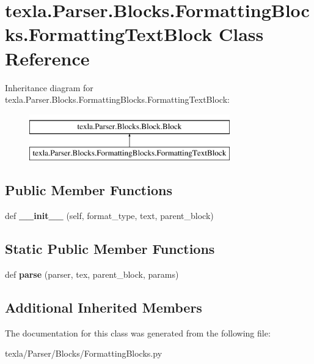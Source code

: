 \hypertarget{classtexla_1_1Parser_1_1Blocks_1_1FormattingBlocks_1_1FormattingTextBlock}{}\section{texla.\+Parser.\+Blocks.\+Formatting\+Blocks.\+Formatting\+Text\+Block Class Reference}
\label{classtexla_1_1Parser_1_1Blocks_1_1FormattingBlocks_1_1FormattingTextBlock}
Inheritance diagram for texla.\+Parser.\+Blocks.\+Formatting\+Blocks.\+Formatting\+Text\+Block\+:\begin{figure}[H]
\begin{center}
\leavevmode
\includegraphics[height=2.000000cm]{classtexla_1_1Parser_1_1Blocks_1_1FormattingBlocks_1_1FormattingTextBlock}
\end{center}
\end{figure}
\subsection*{Public Member Functions}
\begin{DoxyCompactItemize}
\item 
\hypertarget{classtexla_1_1Parser_1_1Blocks_1_1FormattingBlocks_1_1FormattingTextBlock_a21cbd1ee74f54c27c1f0911cac3d62b0}{}\label{classtexla_1_1Parser_1_1Blocks_1_1FormattingBlocks_1_1FormattingTextBlock_a21cbd1ee74f54c27c1f0911cac3d62b0} 
def {\bfseries \+\_\+\+\_\+init\+\_\+\+\_\+} (self, format\+\_\+type, text, parent\+\_\+block)
\end{DoxyCompactItemize}
\subsection*{Static Public Member Functions}
\begin{DoxyCompactItemize}
\item 
\hypertarget{classtexla_1_1Parser_1_1Blocks_1_1FormattingBlocks_1_1FormattingTextBlock_a73841619b03e29bf293e1f465a54b464}{}\label{classtexla_1_1Parser_1_1Blocks_1_1FormattingBlocks_1_1FormattingTextBlock_a73841619b03e29bf293e1f465a54b464} 
def {\bfseries parse} (parser, tex, parent\+\_\+block, params)
\end{DoxyCompactItemize}
\subsection*{Additional Inherited Members}


The documentation for this class was generated from the following file\+:\begin{DoxyCompactItemize}
\item 
texla/\+Parser/\+Blocks/Formatting\+Blocks.\+py\end{DoxyCompactItemize}
